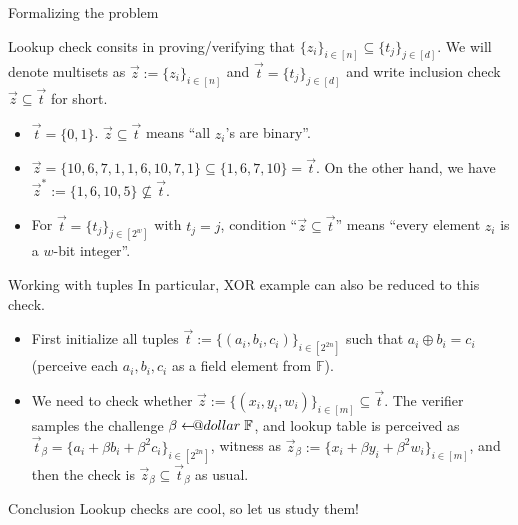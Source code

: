 \documentclass{zkdl-presentation-template}
\makeatletter
\newcommand\leftarrowS{\leftarrow\joinrel\smalldollar}
\newcommand{\smalldollar}{\mathrel{\mathpalette\small@dollar\relax}}
\newcommand{\small@dollar}[2]{%
  \vcenter{\hbox{%
    $#1\textnormal{\fontsize{0.7\dimexpr\f@size pt}{0}\selectfont\$}$%
  }}%
}
\makeatother
\begin{document}
    \begin{frame}{Formalizing the problem}
        \begin{definition}
            Lookup check consits in proving/verifying that $\{z_i\}_{i \in [n]}
            \subseteq \{t_j\}_{j \in [d]}$. We will denote multisets as $\vec{z}
            := \{z_i\}_{i \in [n]}$ and $\vec{t} = \{t_j\}_{j \in [d]}$ and
            write inclusion check $\vec{z} \subseteq \vec{t}$ for short.\pause
        \end{definition}

        \begin{example}
            \begin{itemize}
                \item $\vec{t}=\{0,1\}$. $\vec{z} \subseteq \vec{t}$ means ``all $z_i$'s are binary''.\pause
                \item $\vec{z}=\{10,6,7,1,1,6,10,7,1\} \subseteq \{1,6,7,10\} = \vec{t}$. On the other hand, we 
                have $\vec{z}^* := \{1,6,10,5\} \not\subseteq \vec{t}$.\pause
                \item For $\vec{t} = \{t_j\}_{j \in [2^w]}$ with $t_j=j$,
                condition ``$\vec{z} \subseteq \vec{t}$'' means ``every element
                $z_i$ is a $w$-bit integer''.
            \end{itemize}
        \end{example}
    \end{frame}

    \begin{frame}{Working with tuples}
        In particular, XOR example can also be reduced to this check. 
        \begin{itemize}
            \item First initialize all tuples $\vec{t} := \{(a_i,b_i,c_i)\}_{i
            \in [2^{2n}]}$ such that $a_i \oplus b_i = c_i$ (perceive each
            $a_i,b_i,c_i$ as a field element from $\mathbb{F}$).\pause
            \item We need to check whether $\vec{z} := \{(x_i,y_i,w_i)\}_{i \in
            [m]} \subseteq \vec{t}$. The verifier samples the challenge $\beta
            \leftarrowS \mathbb{F}$, and lookup table is perceived as
            $\vec{t}_{\beta} = \{a_i+\beta b_i+\beta^2 c_i\}_{i \in [2^{2n}]}$,
            witness as $\vec{z}_{\beta} := \{x_i+\beta y_i + \beta^2 w_i\}_{i
            \in [m]}$, and then the check is $\vec{z}_{\beta} \subseteq
            \vec{t}_{\beta}$ as usual.\pause
        \end{itemize}

        \begin{block}{Conclusion}
            Lookup checks are cool, so let us study them!
        \end{block}
    \end{frame}
\end{document}
